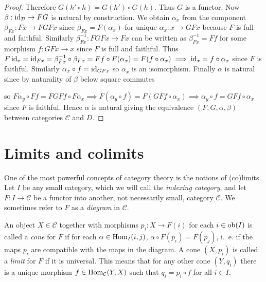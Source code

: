 \documentclass[a4paper,openany]{scrbook}
\renewcommand{\C}{\mathcal C}
\begin{document}
\begin{proof}
Therefore $G(h' \circ h) = G(h') \circ G(h)$. Thus $G$ is a functor. Now $\beta: \operatorname{id}_\mathcal D \to FG$ is natural by construction. We obtain $\alpha_x$ from the component $\beta_{Fx}: Fx \to FGFx$ since $\beta_{Fx} = F(\alpha_x)$ for unique $\alpha_x: x \to GFx$ because $F$ is full and faithful. Similarly $\beta_{Fx}^{-1} : FGFx \to Fx$ can be written as $\beta_{Fx}^{-1} = Ff$ for some morphism $f:GFx \to x$ since $F$ is full and faithful. Thus $F\operatorname{id}_x = \operatorname{id}_{Fx} = \beta_{Fx}^{-1} \circ \beta_{Fx} = Ff \circ F(\alpha_x) = F(f \circ \alpha_x) \implies \operatorname{id}_x = f \circ \alpha_x$ since $F$ is faithful. Similarly $\alpha_x \circ f = \operatorname{id}_{GFx}$ so $\alpha_x$ is an isomorphism. Finally $\alpha$ is natural since by naturality of $\beta$ below square commutes
\begin{center}
\end{center} \noindent
so $F\alpha_y \circ Ff = FGFf \circ F \alpha_x \implies F(\alpha_y \circ f) = F(GFf \circ \alpha_x) \implies \alpha_y \circ f = GFf \circ \alpha_x$ since $F$ is faithful. Hence $\alpha$ is natural giving the equivalence $(F,G, \alpha, \beta)$ between categories $\C$ and $D$.
\end{proof}

\section{Limits and colimits}\label{app:limits}

One of the most powerful concepts of category theory is the notions of (co)limits. Let $I$ be any small category, which we will call the \emph{indexing category}, and let $F\colon I \to \C$ be a functor into another, not necessarily small, category $\C$. We sometimes refer to $F$ as a \emph{diagram} in $\C$.

\begin{defn} An object $X \in \C$ together with morphisms $p_i\colon X \to F(i)$ for each $i \in \operatorname{ob}(I)$ is called a \emph{cone} for $F$ if for each $\alpha \in \operatorname{Hom}_I(i,j)$, $\alpha \circ F(p_i) = F(p_j)$, i.~e. if the maps $p_i$ are compatible with the maps in the diagram. A cone $(X,p_i)$ is called a \emph{limit} for $F$ if it is universal. This means that for any other cone $(Y,q_i)$ there is a unique morphism $f \in \Hom_\C(Y,X)$ such that $q_i = p_i \circ f$ for all $i \in I$.
\end{defn}
\end{document}
